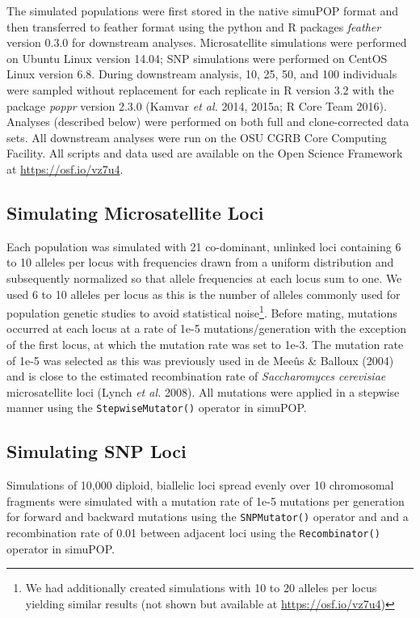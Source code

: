 \documentclass[]{article}
\let\rmarkdownfootnote\footnote%
\def\footnote{\protect\rmarkdownfootnote}
\theoremstyle{definition}
\theoremstyle{definition}
\theoremstyle{definition}
\theoremstyle{remark}
\begin{document}
The simulated populations were first stored in the native simuPOP format
and then transferred to feather format using the python and R packages
\emph{feather} version 0.3.0 for downstream analyses. Microsatellite
simulations were performed on Ubuntu Linux version 14.04; SNP
simulations were performed on CentOS Linux version 6.8. During
downstream analysis, 10, 25, 50, and 100 individuals were sampled
without replacement for each replicate in R version 3.2 with the package
\emph{poppr} version 2.3.0 (Kamvar \emph{et al.} 2014, 2015a; R Core
Team 2016). Analyses (described below) were performed on both full and
clone-corrected data sets. All downstream analyses were run on the OSU
CGRB Core Computing Facility. All scripts and data used are available on
the Open Science Framework at \url{https://osf.io/vz7u4}.

\subsection{Simulating Microsatellite
Loci}\label{simulating-microsatellite-loci}

Each population was simulated with 21 co-dominant, unlinked loci
containing 6 to 10 alleles per locus with frequencies drawn from a
uniform distribution and subsequently normalized so that allele
frequencies at each locus sum to one. We used 6 to 10 alleles per locus
as this is the number of alleles commonly used for population genetic
studies to avoid statistical noise\footnote{We had additionally created
  simulations with 10 to 20 alleles per locus yielding similar results
  (not shown but available at \url{https://osf.io/vz7u4})}. Before
mating, mutations occurred at each locus at a rate of 1e-5
mutations/generation with the exception of the first locus, at which the
mutation rate was set to 1e-3. The mutation rate of 1e-5 was selected as
this was previously used in de Meeûs \& Balloux (2004) and is close to
the estimated recombination rate of \emph{Saccharomyces cerevisiae}
microsatellite loci (Lynch \emph{et al.} 2008). All mutations were
applied in a stepwise manner using the \texttt{StepwiseMutator()}
operator in simuPOP.

\subsection{Simulating SNP Loci}\label{simulating-snp-loci}

Simulations of 10,000 diploid, biallelic loci spread evenly over 10
chromosomal fragments were simulated with a mutation rate of 1e-5
mutations per generation for forward and backward mutations using the
\texttt{SNPMutator()} operator and and a recombination rate of 0.01
between adjacent loci using the \texttt{Recombinator()} operator in
simuPOP.
\end{document}
